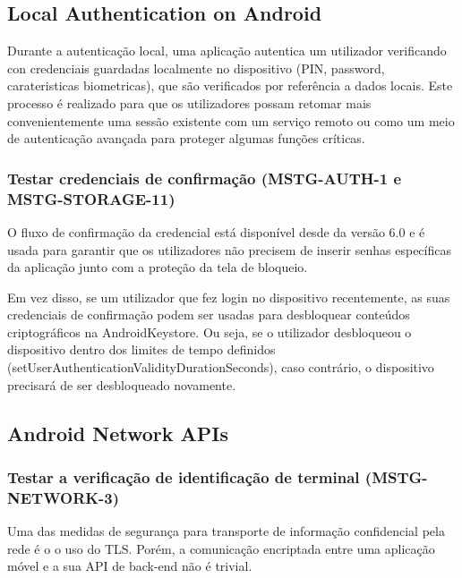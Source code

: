 \documentclass{article}
\begin{document}
\subsection{Local Authentication on Android}
\par Durante a autenticação local, uma aplicação autentica um utilizador verificando con credenciais guardadas localmente no dispositivo (PIN, password, carateristicas biometricas), que são verificados por referência a dados locais. Este processo é realizado para que os utilizadores possam retomar mais convenientemente uma sessão existente com um serviço remoto ou como um meio de autenticação avançada para proteger algumas funções críticas.



\subsubsection{Testar credenciais de confirmação (MSTG-AUTH-1 e MSTG-STORAGE-11)}
\par O fluxo de confirmação da credencial está disponível desde da versão 6.0 e é usada para garantir que os utilizadores não precisem de inserir senhas específicas da aplicação junto com a proteção da tela de bloqueio. 

\par Em vez disso, se um utilizador que fez login no dispositivo recentemente, as suas credenciais de confirmação podem ser usadas para desbloquear conteúdos criptográficos na AndroidKeystore. Ou seja, se o utilizador desbloqueou o dispositivo dentro dos limites de tempo definidos (setUserAuthenticationValidityDurationSeconds), caso contrário, o dispositivo precisará de ser desbloqueado novamente.





\subsection{Android Network APIs}

\subsubsection{Testar a verificação de identificação de terminal (MSTG-NETWORK-3)}
\par Uma das medidas de segurança para transporte de informação confidencial pela rede é o o uso do TLS. Porém, a comunicação encriptada entre uma aplicação móvel e a sua API de back-end não é trivial. 
\end{document}

